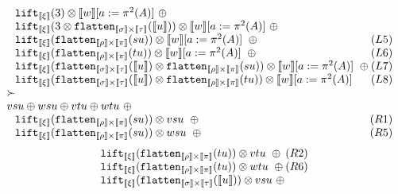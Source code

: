 \documentclass[a4paper,UKenglish,cleveref,autoref,numberwithinsect]{lipics-v2019}
\theoremstyle{definition}
\newcommand{\flatten}{\mathtt{flatten}}
\newcommand{\lift}{\mathtt{lift}}
\newcommand{\typeinterpret}[1]{\llbracket #1 \rrbracket}
\newcommand{\interpret}[1]{\llbracket #1 \rrbracket}
\begin{document}
\begin{itemize}
\[\begin{array}{l}
  \phantom{A}
    \lift_{\typeinterpret{\xi}}(3) \otimes \interpret{w}[a:=\pi^2(A)]
    \ \oplus \\
  \phantom{A}
    \lift_{\typeinterpret{\xi}}(3 \otimes
    \flatten_{\typeinterpret{\sigma} \times \typeinterpret{\tau}}(
    \interpret{u})) \otimes
    \interpret{w}[a:=\pi^2(A)]
    \ \oplus \\
  \phantom{A}
    \lift_{\typeinterpret{\xi}}(\flatten_{\typeinterpret{\rho} \times
    \typeinterpret{\pi}}(su)) \otimes
    \interpret{w}[a:=\pi^2(A)]
    \ \oplus \hfill (L5) \\
  \phantom{A}
    \lift_{\typeinterpret{\xi}}(\flatten_{\typeinterpret{\rho} \times
    \typeinterpret{\pi}}(tu)) \otimes
    \interpret{w}[a:=\pi^2(A)]
    \ \oplus \hfill (L6) \\
  \phantom{A}
    \lift_{\typeinterpret{\xi}}(\flatten_{\typeinterpret{\sigma} \times
    \typeinterpret{\tau}}(\interpret{u}) \otimes
    \flatten_{\typeinterpret{\rho} \times \typeinterpret{\pi}}(su))
    \otimes
    \interpret{w}[a:=\pi^2(A)]
    \ \oplus \hfill (L7) \\
  \phantom{A}
    \lift_{\typeinterpret{\xi}}(\flatten_{\typeinterpret{\sigma} \times
    \typeinterpret{\tau}}(\interpret{u}) \otimes
    \flatten_{\typeinterpret{\rho} \times \typeinterpret{\pi}}(tu))
    \otimes
    \interpret{w}[a:=\pi^2(A)] \hfill (L8) \\
  \succ \\
  vsu \oplus wsu \oplus
    vtu \oplus wtu\ \oplus \\
  \phantom{A}
    \lift_{\typeinterpret{\xi}}(\flatten_{\typeinterpret{\rho} \times
    \typeinterpret{\pi}}(su)) \otimes vsu\ \oplus
    \hfill (R1) \\
  \phantom{A}
    \lift_{\typeinterpret{\xi}}(\flatten_{\typeinterpret{\rho}
    \times \typeinterpret{\pi}}(su)) \otimes wsu\ \oplus
    \hfill (R5) \\
  \end{array}\]\[\begin{array}{l}
  \phantom{A}
    \lift_{\typeinterpret{\xi}}(\flatten_{\typeinterpret{\rho} \times
    \typeinterpret{\pi}}(tu)) \otimes vtu\ \oplus \hfill (R2) \\
  \phantom{A}
    \lift_{\typeinterpret{\xi}}(\flatten_{\typeinterpret{\rho}
    \times \typeinterpret{\pi}}(tu)) \otimes wtu\ \oplus
    \hfill (R6) \\
  \phantom{A}
    \lift_{\typeinterpret{\xi}}(\flatten_{\typeinterpret{\sigma}
    \times \typeinterpret{\tau}}(\interpret{u})) \otimes vsu\ \oplus \\

\end{array}\]
\end{itemize}
\end{document}
